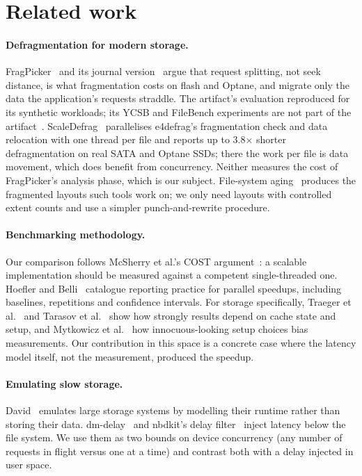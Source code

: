 \section{Related work}
\label{sec:related}

\paragraph{Defragmentation for modern storage.}
FragPicker~\cite{park2021fragpicker} and its journal version~\cite{park2023tocs}
argue that request splitting, not seek distance, is what fragmentation costs on
flash and Optane, and migrate only the data the application's requests straddle.
The artifact's evaluation reproduced for its synthetic workloads; its YCSB and
FileBench experiments are not part of the artifact~\cite{sosp21ae}. ScaleDefrag~\cite{lee2026scaledefrag}
parallelises e4defrag's fragmentation check and data relocation with one thread per
file and reports up to 3.8$\times$ shorter defragmentation on real SATA and Optane
SSDs; there the work per file is data movement, which does benefit from
concurrency. Neither measures the cost of FragPicker's analysis phase, which is our
subject. File-system aging~\cite{smith1997aging,conway2017aging,kadekodi2018geriatrix}
produces the fragmented layouts such tools work on; we only need layouts with
controlled extent counts and use a simpler punch-and-rewrite procedure.

\paragraph{Benchmarking methodology.}
Our comparison follows McSherry et al.'s COST argument~\cite{mcsherry2015cost}: a
scalable implementation should be measured against a competent single-threaded
one. Hoefler and Belli~\cite{hoefler2015scientific} catalogue reporting practice for
parallel speedups, including baselines, repetitions and confidence intervals. For
storage specifically, Traeger et al.~\cite{traeger2008nine} and Tarasov et
al.~\cite{tarasov2011benchmarking} show how strongly results depend on cache state
and setup, and Mytkowicz et al.~\cite{mytkowicz2009wrong} how innocuous-looking setup
choices bias measurements. Our contribution in this space is a concrete case where
the latency model itself, not the measurement, produced the speedup.

\paragraph{Emulating slow storage.}
David~\cite{agrawal2011david} emulates large storage systems by modelling their
runtime rather than storing their data. dm-delay~\cite{kerneldmdelay} and nbdkit's
delay filter~\cite{nbdkit} inject latency below the file system. We use them as two
bounds on device concurrency (any number of requests in flight versus one at a
time) and contrast both with a delay injected in user space.
